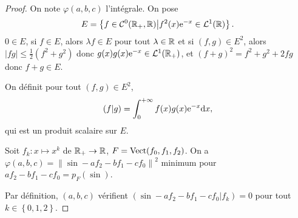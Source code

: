 \documentclass[12pt]{article}
\begin{document}
\begin{proof}
	On note $\varphi(a,b,c)$ l'intégrale. On pose 
	\begin{equation}
		E=\left\lbrace f\in\mathcal{C}^{0}(\mathbb{R}_{+},\mathbb{R})\middle| f^{2}(x)\mathrm{e}^{-x}\in\mathcal{L}^{1}(\mathbb{R})\right\rbrace.
	\end{equation}
	$0\in E$, si $f\in E$, alors $\lambda f\in E$ pour tout $\lambda\in\mathbb{R}$ et si $(f,g)\in E^{2}$, alors $\left\lvert fg\right\rvert\leqslant\frac{1}{2}(f^{2}+g^{2})$ donc $g(x)g(x)\mathrm{e}^{-x}\in\mathcal{L}^{1}(\mathbb{R}_+)$, et $(f+g)^{2}=f^{2}+g^{2}+2fg$ donc $f+g\in E$.

	On définit pour tout $(f,g)\in E^{2}$,
	\begin{equation}
		(f|g)=\int_{0}^{+\infty}f(x)g(x)\mathrm{e}^{-x}\mathrm{d} x,
	\end{equation}
	qui est un produit scalaire sur $E$.

	Soit $f_k\colon x\mapsto x^{k}$ de $\mathbb{R}_{+}\to\mathbb{R}$, $F=\operatorname{Vect}(f_0,f_1,f_2)$. On a $\varphi(a,b,c)=\left\lVert\sin-af_2-bf_1-cf_0\right\rVert^{2}$ minimum pour $af_2-bf_1-cf_0=p_F(\sin)$.

	Par définition, $(a,b,c)$ vérifient $(\sin-af_2-bf_1-cf_0|f_k)=0$ pour tout $k\in\left\lbrace0,1,2\right\rbrace$.


\end{proof}
\end{document}
